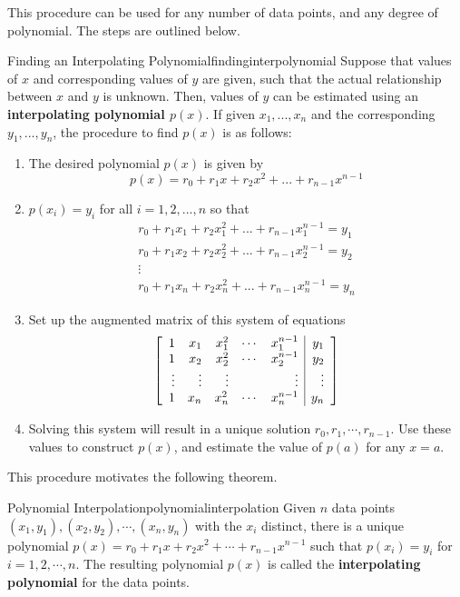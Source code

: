 This procedure can be used for any number of data points, and any degree of polynomial. The steps are outlined below.

\begin{procedure}{Finding an Interpolating Polynomial}{findinginterpolynomial}
Suppose that values of $x$ and corresponding values of $y$ are given, such that the actual relationship between $x$ and $y$ is unknown. Then, values of $y$ can be estimated using an \textbf{interpolating polynomial $p(x)$}. If given $x_1, ..., x_n$ and the corresponding $y_1, ..., y_n$, the procedure to find $p(x)$ is as follows:
\begin{enumerate}
\item The desired polynomial $p(x)$ is given by 
\[
p(x) = r_0 + r_1 x + r_2 x^2 + ... + r_{n-1}x^{n-1}
\]
\item $p(x_i) = y_i$ for all $i = 1, 2, ...,n$ so that
\[
\begin{array}{c}
r_0 + r_1x_1 + r_2 x_1^2 + ... + r_{n-1}x_1^{n-1} = y_1 \\
r_0 + r_1x_2 + r_2 x_2^2 + ... + r_{n-1}x_2^{n-1} = y_2 \\
\vdots \\
r_0 + r_1x_n + r_2 x_n^2 + ... + r_{n-1}x_n^{n-1} = y_n 
\end{array}
\]
\item Set up the augmented matrix of this system of equations
\[
\left[
\begin{array}{rrrrr|r}
1 & x_1 & x_1^2 & \cdots & x_1^{n-1} & y_1 \\
1 & x_2 & x_2^2 & \cdots & x_2^{n-1} & y_2 \\
\vdots & \vdots & \vdots & &\vdots & \vdots \\
1 & x_n & x_n^2 & \cdots & x_n^{n-1} & y_n \\
\end{array}
\right]
\]

\item Solving this system will result in a unique solution $r_0, r_1, \cdots, r_{n-1}$. Use these values to construct $p(x)$, and estimate the value of $p(a)$ for any $x=a$. 
\end{enumerate}

\end{procedure}

This procedure motivates the following theorem.

\begin{theorem}{Polynomial Interpolation}{polynomialinterpolation}
Given $n$ data points $(x_1, y_1), (x_2, y_2), \cdots, (x_n, y_n)$ with the $x_i$ distinct, there is a unique polynomial $p(x) = r_0 + r_1x + r_2x^2 + \cdots + r_{n-1}x^{n-1}$ such that $p(x_i) = y_i$ for $i=1,2,\cdots, n$. The resulting polynomial $p(x)$ is called the \textbf{interpolating polynomial} for the data points. 
\end{theorem}

